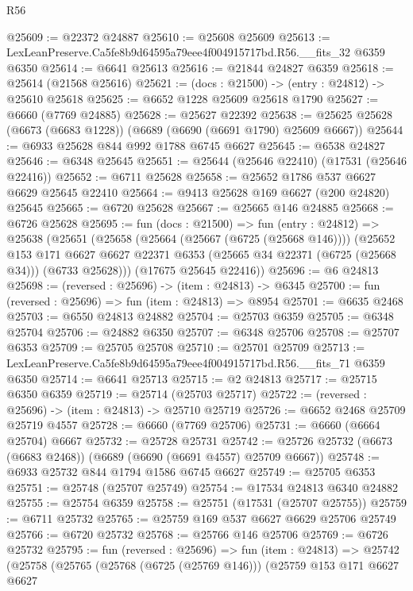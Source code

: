 \begin{lexlean}{R56}
\begin{coremodule}
@25609 := @22372 @24887
@25610 := @25608 @25609
@25613 := LexLeanPreserve.Ca5fe8b9d64595a79eee4f004915717bd.R56.__fits_32 @6359 @6350
@25614 := @6641 @25613
@25616 := @21844 @24827 @6359
@25618 := @25614 (@21568 @25616)
@25621 := (docs : @21500) -> (entry : @24812) -> @25610 @25618
@25625 := @6652 @1228 @25609 @25618 @1790
@25627 := @6660 (@7769 @24885)
@25628 := @25627 @22392
@25638 := @25625 @25628 (@6673 (@6683 @1228)) (@6689 (@6690 (@6691 @1790) @25609 @6667))
@25644 := @6933 @25628 @844 @992 @1788 @6745 @6627
@25645 := @6538 @24827
@25646 := @6348 @25645
@25651 := @25644 (@25646 @22410) (@17531 (@25646 @22416))
@25652 := @6711 @25628
@25658 := @25652 @1786 @537 @6627 @6629 @25645 @22410
@25664 := @9413 @25628 @169 @6627 (@200 @24820) @25645
@25665 := @6720 @25628
@25667 := @25665 @146 @24885
@25668 := @6726 @25628
@25695 := fun (docs : @21500) =>
  fun (entry : @24812) =>
  @25638
    (@25651
      (@25658
        (@25664 (@25667 (@6725 (@25668 @146))))
        (@25652
          @153
          @171
          @6627
          @6627
          @22371
          @6353
          (@25665 @34 @22371 (@6725 (@25668 @34)))
          (@6733 @25628)))
      (@17675 @25645 @22416))
@25696 := @6 @24813
@25698 := (reversed : @25696) -> (item : @24813) -> @6345
@25700 := fun (reversed : @25696) => fun (item : @24813) => @8954
@25701 := @6635 @2468
@25703 := @6550 @24813 @24882
@25704 := @25703 @6359
@25705 := @6348 @25704
@25706 := @24882 @6350
@25707 := @6348 @25706
@25708 := @25707 @6353
@25709 := @25705 @25708
@25710 := @25701 @25709
@25713 := LexLeanPreserve.Ca5fe8b9d64595a79eee4f004915717bd.R56.__fits_71 @6359 @6350
@25714 := @6641 @25713
@25715 := @2 @24813
@25717 := @25715 @6350 @6359
@25719 := @25714 (@25703 @25717)
@25722 := (reversed : @25696) -> (item : @24813) -> @25710 @25719
@25726 := @6652 @2468 @25709 @25719 @4557
@25728 := @6660 (@7769 @25706)
@25731 := @6660 (@6664 @25704) @6667
@25732 := @25728 @25731
@25742 := @25726 @25732 (@6673 (@6683 @2468)) (@6689 (@6690 (@6691 @4557) @25709 @6667))
@25748 := @6933 @25732 @844 @1794 @1586 @6745 @6627
@25749 := @25705 @6353
@25751 := @25748 (@25707 @25749)
@25754 := @17534 @24813 @6340 @24882
@25755 := @25754 @6359
@25758 := @25751 (@17531 (@25707 @25755))
@25759 := @6711 @25732
@25765 := @25759 @169 @537 @6627 @6629 @25706 @25749
@25766 := @6720 @25732
@25768 := @25766 @146 @25706
@25769 := @6726 @25732
@25795 := fun (reversed : @25696) =>
  fun (item : @24813) =>
  @25742
    (@25758
      (@25765
        (@25768 (@6725 (@25769 @146)))
        (@25759
          @153
          @171
          @6627
          @6627

\end{coremodule}
\end{lexlean}
